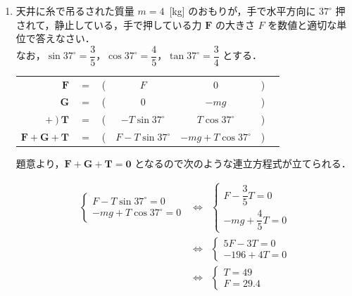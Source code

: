 \documentclass[a4paper,11pt]{ltjsarticle}
\begin{document}
\begin{enumerate}
  \item 天井に糸で吊るされた質量 $m=4$\ [kg] のおもりが，手で水平方向に $37^{\circ}$ 押されて，静止している，手で押している力 $\bm{F}$ の大きさ $F$ を数値と適切な単位で答えなさい．\\
  なお，$\sin 37^{\circ}=\dfrac{3}{5}$，$\cos 37^{\circ}=\dfrac{4}{5}$，$\tan 37^{\circ}=\dfrac{3}{4}$ とする．
  \begin{table}[hb]
    \centering
    \begin{tabular}{rcccccc}
      $\bm{F}$ & $=$ & ( & $F$ & $0$ & ) \\
      $\bm{G}$ & $=$ & ( & $0$ & $-mg$ & ) \\
      $+\ )\ \bm{T}$ & $=$ & ( & $-T \sin 37^{\circ}$ & $T \cos 37^{\circ}$ & ) \\
    \hline
      $\bm{F}+\bm{G}+\bm{T}$ & $=$ & ( & $F-T \sin 37^{\circ}$ & $-mg+T \cos 37^{\circ}$ & ) \\
    \end{tabular}
  \end{table}

題意より，$\bm{F}+\bm{G}+\bm{T} = \bm{0}$ となるので次のような連立方程式が立てられる．

  \begin{equation}
    \renewcommand{\arraystretch}{2}
    \begin{array}{rcl}
      \begin{cases}
        F-T \sin 37^{\circ} = 0 \\
        -mg+T \cos 37^{\circ} = 0
      \end{cases}
      &\Leftrightarrow&
      \begin{cases}
        F-\dfrac{3}{5}T = 0 \\
        -mg+\dfrac{4}{5}T = 0
      \end{cases}
      \\[20pt]
      &\Leftrightarrow&
      \begin{cases}
        5F - 3T = 0 \\
        -196 + 4T = 0
      \end{cases}
      \\[10pt]
      &\Leftrightarrow&
      \begin{cases}
        T = 49 \\
        F = 29.4
      \end{cases}
    \end{array}
  \end{equation}


\end{enumerate}
\end{document}
